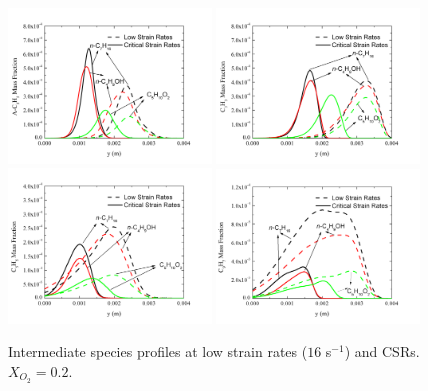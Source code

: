 \documentclass[review,3p,times]{elsarticleUS}
\begin{document}
\begin{figure}[h]
  \centering
  \scriptsize
  \includegraphics[trim=4mm 8mm 30mm 20mm, clip=true, width=0.48\textwidth]{A-C3H5-y.png}
  \includegraphics[trim=4mm 8mm 30mm 20mm, clip=true, width=0.48\textwidth]{C3H3-y.png}
  \includegraphics[trim=4mm 8mm 30mm 20mm, clip=true, width=0.48\textwidth]{C5H5-y.png}
  \includegraphics[trim=4mm 8mm 30mm 20mm, clip=true, width=0.48\textwidth]{C9H7-y.png}
  \normalsize
  \vspace{-0.2in}
  \caption{Intermediate species profiles at low strain rates ($16$ s$^{-1}$) and CSRs. $X_{O_2}=0.2$.}
  \label{fig:CxHy}
\end{figure}
\end{document}
